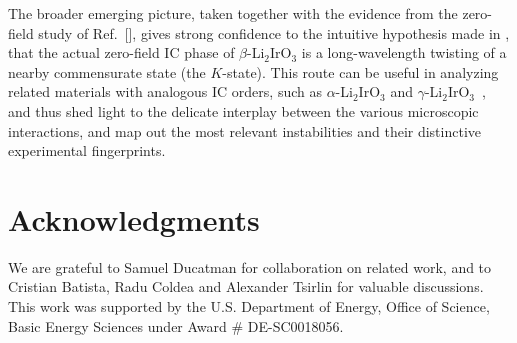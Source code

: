 \documentclass[prx,aps,groupedaddress,twocolumn]{revtex4-1}
\begin{document}
The broader emerging picture, taken together with the evidence from the zero-field study of Ref.~[], gives strong confidence to the intuitive hypothesis made in \cite{Sam2018}, that the actual zero-field IC phase of $\beta$-Li$_2$IrO$_3$ is a long-wavelength twisting of a nearby commensurate state (the $K$-state). 
%
This route can be useful in analyzing related materials with analogous IC orders, such as $\alpha$-Li$_2$IrO$_3$ and $\gamma$-Li$_2$IrO$_3$~\cite{Singh2012,Biffin2014b,Modic2014,Williams2016,Satoshi2016}, and thus shed light to the delicate interplay between the various microscopic interactions, and map out the most relevant instabilities and their distinctive experimental fingerprints.



\vspace*{-0.3cm}
\section{Acknowledgments}
\vspace*{-0.3cm}
We are grateful to Samuel Ducatman for collaboration on related work, and to Cristian Batista, Radu Coldea and Alexander Tsirlin for valuable discussions. 
%
This work was supported by the U.S. Department of Energy,  Office of Science, Basic Energy Sciences under Award \# DE-SC0018056.




\end{document}
